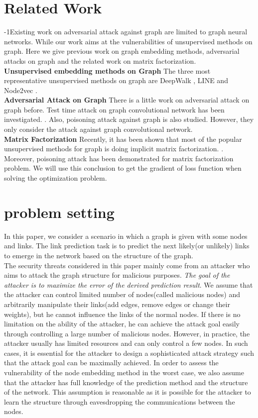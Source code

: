 \documentclass{acmtog} %
\begin{document}
\section{Related Work}
\label{sec:relatedwork}
%
\looseness-1Existing work \cite{NeuralAttack} \cite{NeuralAttack2} on adversarial attack against graph are limited to graph neural networks. While our work aims at the vulnerabilities of unsupervised methods on graph. Here we give previous work on graph embedding methods, adversarial attacks on graph and the related work on matrix factorization.\\
\textbf{Unsupervised embedding methods on Graph} The three most representative unsupervised methods on graph are DeepWalk \cite{Deepwalk}, LINE \cite{Line} and Node2vec \cite{Node2vec}.\\
\textbf{Adversarial Attack on Graph} There is a little work on adversarial attack on graph before. Test time attack on graph convolutional network has been investigated. \cite{NeuralAttack}. Also, poisoning attack against graph is also studied. \cite{NeuralAttack2} However, they only consider the attack against graph convolutional network.\\
\textbf{Matrix Factorization} Recently, it has been shown that most of the popular unsupervised methods for graph is doing implicit matrix factorization. \cite{Matrix}. Moreover, poisoning attack has been demonstrated for matrix factorization problem. \cite{Matrixattack}
We will use this conclusion to get the gradient of loss function when solving the optimization problem.


\section{problem setting}
In this paper, we consider a scenario in which a graph is given with some nodes and links.
The link prediction task is to predict the next likely(or unlikely) links to emerge in the network based on the structure of the graph.\\
\indent The security threats considered in this paper mainly come from an attacker who aims to attack the graph structure for malicious purposes. \textit{The goal of the attacker is to maximize the error of the derived prediction result}.
We assume that the attacker can control limited number of nodes(called malicious nodes) and arbitrarily manipulate their links(add edges, remove edges or change their weights), but he cannot influence the links of the normal nodes.
If there is no limitation on the ability of the attacker, he can achieve the attack goal easily through controlling a large number of malicious nodes. However, in practice, the attacker usually has limited resources and can only control a few nodes.
In such cases, it is essential for the attacker to design a sophisticated attack strategy such that the attack goal can be maximally achieved. In order to assess the vulnerability of the node embedding method in the worst case, we
also assume that the attacker has full knowledge of the prediction method and the structure of the network.
This assumption is reasonable as it is possible for the attacker to learn the structure through eavesdropping the communications between the nodes. 
\end{document}
